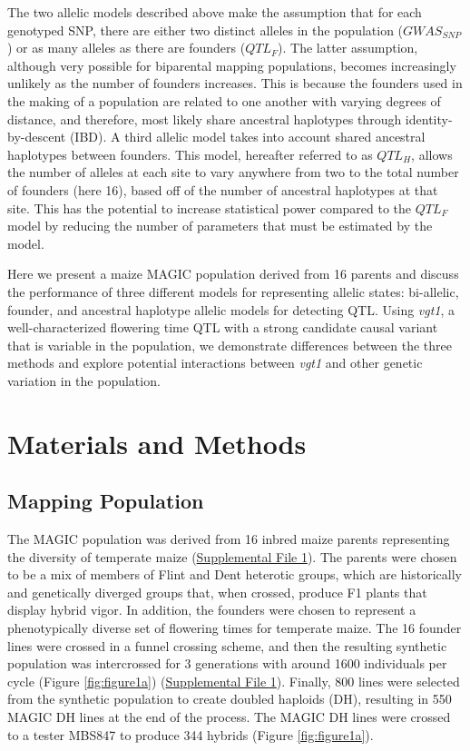 \documentclass[9pt,twocolumn,twoside]{gsag3jnl}
\begin{document}
The two allelic models described above make the assumption that for each genotyped SNP, there are either two distinct alleles in the population ($GWAS_{SNP}$) or as many alleles as there are founders ($QTL_F$).
The latter assumption, although very possible for biparental mapping populations, becomes increasingly unlikely as the number of founders increases.
This is because the founders used in the making of a population are related to one another with varying degrees of distance, and therefore, most likely share ancestral haplotypes through identity-by-descent (IBD).
A third allelic model takes into account shared ancestral haplotypes between founders.
This model, hereafter referred to as $QTL_H$, allows the number of alleles at each site to vary anywhere from two to the total number of founders (here 16), based off of the number of ancestral haplotypes at that site.
This has the potential to increase statistical power compared to the $QTL_F$ model by reducing the number of parameters that must be estimated by the model.

Here we present a maize MAGIC population derived from 16 parents and discuss the performance of three different models for representing allelic states: bi-allelic, founder, and ancestral haplotype allelic models for detecting QTL.
Using \emph{vgt1}, a well-characterized flowering time QTL with a strong candidate causal variant that is variable in the population, we demonstrate differences between the three methods and explore potential interactions between \emph{vgt1} and other genetic variation in the population.

\section{Materials and Methods}
\label{sec:materials:methods}
\subsection{Mapping Population}
The MAGIC population was derived from 16 inbred maize parents representing the diversity of temperate maize (\href{run:./figures/Methods_Supplementa1.docx}{Supplemental File 1}).
The parents were chosen to be a mix of members of Flint and Dent heterotic groups, which are historically and genetically diverged groups that, when crossed, produce F1 plants that display hybrid vigor.
In addition, the founders were chosen to represent a phenotypically diverse set of flowering times for temperate maize.
The 16 founder lines were crossed in a funnel crossing scheme, and then the resulting synthetic population was intercrossed for 3 generations with around 1600 individuals per cycle (Figure \ref{fig:figure1a}) (\href{run:./figures/Methods_Supplementa1.docx}{Supplemental File 1}).
Finally, 800 lines were selected from the synthetic population to create doubled haploids (DH), resulting in 550 MAGIC DH lines at the end of the process.
The MAGIC DH lines were crossed to a tester MBS847 to produce 344 hybrids (Figure \ref{fig:figure1a}).
\end{document}
